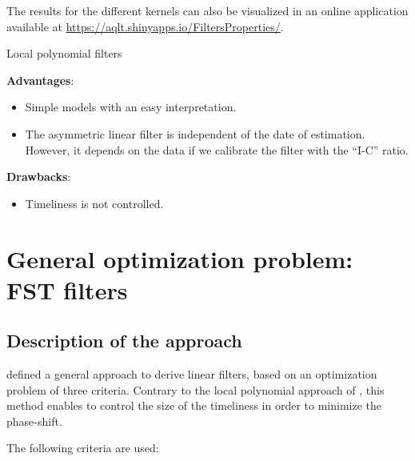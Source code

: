 \documentclass[
  12pt,
  ,
  a4paper]{article}
\providecommand{\tightlist}{%
  \setlength{\itemsep}{0pt}\setlength{\parskip}{0pt}}
\newcommand\1{\mathds{1}}
\begin{document}
The results for the different kernels can also be visualized in an online application available at \url{https://aqlt.shinyapps.io/FiltersProperties/}.

\begin{summary_box}{Local polynomial filters}

\textbf{Advantages}:

\begin{itemize}
\item
  Simple models with an easy interpretation.
\item
  The asymmetric linear filter is independent of the date of estimation.
  However, it depends on the data if we calibrate the filter with the ``I-C'' ratio.
\end{itemize}

\textbf{Drawbacks}:

\begin{itemize}
\tightlist
\item
  Timeliness is not controlled.
\end{itemize}

\end{summary_box}

\hypertarget{sec:GuggemosEtAl}{%
\section{General optimization problem: FST filters}\label{sec:GuggemosEtAl}}

\hypertarget{description-of-the-approach}{%
\subsection{Description of the approach}\label{description-of-the-approach}}

\textcite{ch15HBSA} defined a general approach to derive linear filters, based on an optimization problem of three criteria.
Contrary to the local polynomial approach of \textcite{proietti2008}, this method enables to control the size of the timeliness in order to minimize the phase-shift.

The following criteria are used:
\end{document}
